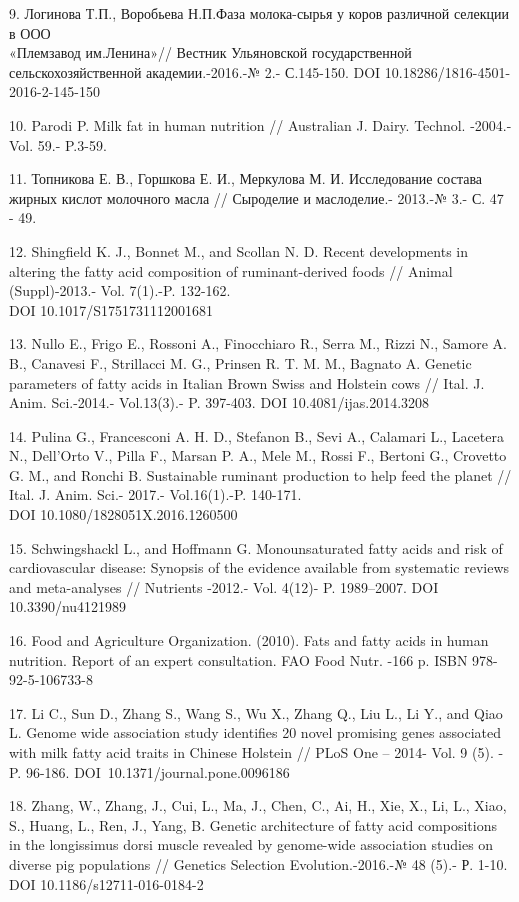 \begin{noparindent}
9. Логинова Т.П., Воробьева Н.П.Фаза молока-сырья у коров различной
селекции в ООО \\«Племзавод им.Ленина»// Вестник Ульяновской
государственной сельскохозяйственной академии.-2016.-№ 2.- С.145-150.
DOI 10.18286/1816-4501-2016-2-145-150

10. Parodi P. Milk fat in human nutrition // Australian J. Dairy.
Technol. -2004.-Vol. 59.- P.3-59.

11. Топникова Е. В., Горшкова Е. И., Меркулова М. И. Исследование
состава жирных кислот молочного масла // Сыроделие и маслоделие.-
2013.-№ 3.- С. 47 - 49.

12. Shingfield K. J., Bonnet M., and Scollan N. D. Recent developments
in altering the fatty acid composition of ruminant-derived foods //
Animal (Suppl)-2013.- Vol. 7(1).-P. 132-162. \\DOI 10.1017/S1751731112001681

13. Nullo E., Frigo E., Rossoni A., Finocchiaro R., Serra M., Rizzi N.,
Samore A. B., Canavesi F., Strillacci M. G., Prinsen R. T. M. M.,
Bagnato A. Genetic parameters of fatty acids in Italian Brown Swiss and
Holstein cows // Ital. J. Anim. Sci.-2014.- Vol.13(3).- P. 397-403. DOI 10.4081/ijas.2014.3208

14. Pulina G., Francesconi A. H. D., Stefanon B., Sevi A., Calamari L.,
Lacetera N., Dell'Orto V., Pilla F., Marsan P. A., Mele M., Rossi F.,
Bertoni G., Crovetto G. M., and Ronchi B. Sustainable ruminant
production to help feed the planet // Ital. J. Anim. Sci.- 2017.-
Vol.16(1).-P. 140-171. \\DOI 10.1080/1828051X.2016.1260500

15. Schwingshackl L., and Hoffmann G. Monounsaturated fatty acids and
risk of cardiovascular disease: Synopsis of the evidence available from
systematic reviews and meta-analyses // Nutrients -2012.- Vol. 4(12)- P.
1989--2007. DOI 10.3390/nu4121989

16. Food and Agriculture Organization. (2010). Fats and fatty acids in
human nutrition. Report of an expert consultation. FAO Food Nutr. -166
p. ISBN 978-92-5-106733-8

17. Li C., Sun D., Zhang S., Wang S., Wu X., Zhang Q., Liu L., Li Y.,
and Qiao L. Genome wide association study identifies 20 novel promising
genes associated with milk fatty acid traits in Chinese Holstein // PLoS
One -- 2014- Vol. 9 (5). - P. 96-186. DOI~10.1371/journal.pone.0096186

18. Zhang, W., Zhang, J., Cui, L., Ma, J., Chen, C., Ai, H., Xie, X.,
Li, L., Xiao, S., Huang, L., Ren, J., Yang, B. Genetic architecture of
fatty acid compositions in the longissimus dorsi muscle revealed by
genome-wide association studies on diverse pig populations // Genetics
Selection Evolution.-2016.-№ 48 (5).- Р. 1-10. DOI
10.1186/s12711-016-0184-2


\end{noparindent}
